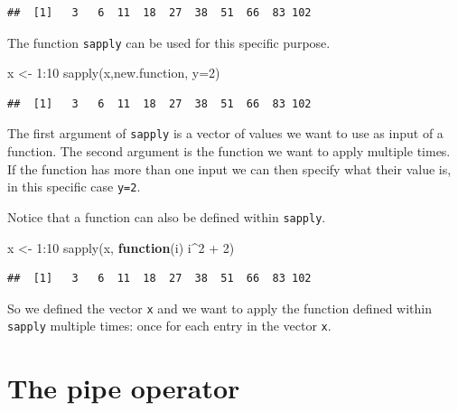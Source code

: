 \documentclass[
]{book}
\newenvironment{Shaded}{\begin{snugshade}}{\end{snugshade}}
\newcommand{\AttributeTok}[1]{\textcolor[rgb]{0.77,0.63,0.00}{#1}}
\newcommand{\ControlFlowTok}[1]{\textcolor[rgb]{0.13,0.29,0.53}{\textbf{#1}}}
\newcommand{\DecValTok}[1]{\textcolor[rgb]{0.00,0.00,0.81}{#1}}
\newcommand{\FunctionTok}[1]{\textcolor[rgb]{0.00,0.00,0.00}{#1}}
\newcommand{\NormalTok}[1]{#1}
\newcommand{\OtherTok}[1]{\textcolor[rgb]{0.56,0.35,0.01}{#1}}
\newcommand{\SpecialCharTok}[1]{\textcolor[rgb]{0.00,0.00,0.00}{#1}}
\begin{document}
\begin{verbatim}
##  [1]   3   6  11  18  27  38  51  66  83 102
\end{verbatim}

The function \texttt{sapply} can be used for this specific purpose.

\begin{Shaded}
\begin{Highlighting}[]
\NormalTok{x }\OtherTok{\textless{}{-}} \DecValTok{1}\SpecialCharTok{:}\DecValTok{10}
\FunctionTok{sapply}\NormalTok{(x,new.function, }\AttributeTok{y=}\DecValTok{2}\NormalTok{)}
\end{Highlighting}
\end{Shaded}

\begin{verbatim}
##  [1]   3   6  11  18  27  38  51  66  83 102
\end{verbatim}

The first argument of \texttt{sapply} is a vector of values we want to use as input of a function. The second argument is the function we want to apply multiple times. If the function has more than one input we can then specify what their value is, in this specific case \texttt{y=2}.

Notice that a function can also be defined within \texttt{sapply}.

\begin{Shaded}
\begin{Highlighting}[]
\NormalTok{x }\OtherTok{\textless{}{-}} \DecValTok{1}\SpecialCharTok{:}\DecValTok{10}
\FunctionTok{sapply}\NormalTok{(x, }\ControlFlowTok{function}\NormalTok{(i) i}\SpecialCharTok{\^{}}\DecValTok{2} \SpecialCharTok{+} \DecValTok{2}\NormalTok{)}
\end{Highlighting}
\end{Shaded}

\begin{verbatim}
##  [1]   3   6  11  18  27  38  51  66  83 102
\end{verbatim}

So we defined the vector \texttt{x} and we want to apply the function defined within \texttt{sapply} multiple times: once for each entry in the vector \texttt{x}.

\hypertarget{the-pipe-operator}{%
\section{The pipe operator}\label{the-pipe-operator}}
\end{document}
